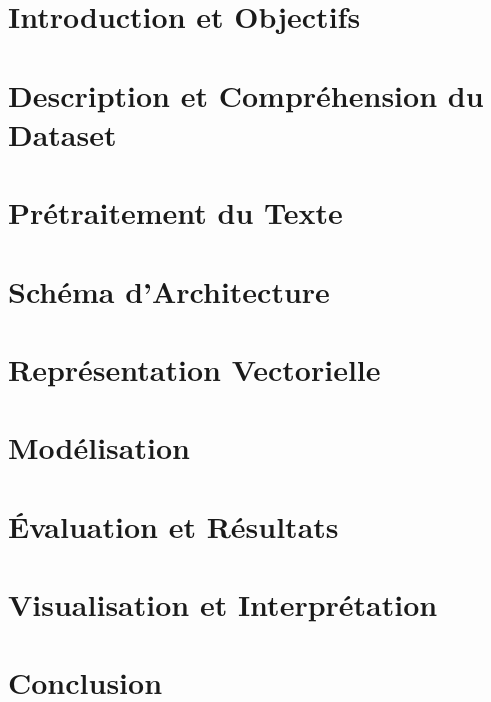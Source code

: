 \documentclass[12pt,a4paper]{article}
\begin{document}
\begin{abstract}
\noindent Ce rapport présente un pipeline complet de Text Mining appliqué à l'analyse de
sentiment sur le dataset Sentiment140 (1,6 million de tweets annotés). Nous couvrons
l'intégralité du processus : compréhension des données, prétraitement NLP avancé (gestion
des emojis, hashtags, contractions), représentation vectorielle (BoW, TF-IDF, N-grams,
Word2Vec), et modélisation avec cinq algorithmes allant du Naïve Bayes au fine-tuning de
DistilBERT. Le modèle BERT fine-tuné atteint un \textbf{F1-score de 0.921}, confirmant la
supériorité des modèles pré-entraînés contextuels pour les tâches de classification de texte.
\end{abstract}

\tableofcontents\newpage

\section{Introduction et Objectifs}


\section{Description et Compréhension du Dataset}


\section{Prétraitement du Texte}


\section{Schéma d'Architecture}


\section{Représentation Vectorielle}


\section{Modélisation}


\section{Évaluation et Résultats}


\section{Visualisation et Interprétation}


\section{Conclusion}

\end{document}
